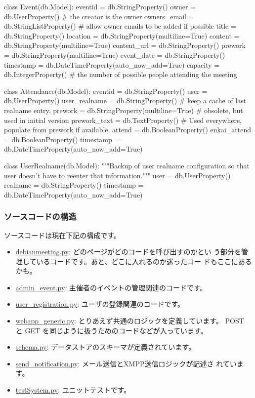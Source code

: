\documentclass[mingoth,a4paper]{jsarticle}
\begin{document}
\begin{commandline}

class Event(db.Model):
    eventid = db.StringProperty()
    owner = db.UserProperty() # the creator is the owner
    owners_email = db.StringListProperty() # allow owner emails to be added if possible
    title = db.StringProperty()
    location = db.StringProperty(multiline=True)
    content = db.StringProperty(multiline=True)
    content_url = db.StringProperty()
    prework = db.StringProperty(multiline=True)
    event_date = db.StringProperty()
    timestamp = db.DateTimeProperty(auto_now_add=True)
    capacity = db.IntegerProperty() # the number of possible people attending the meeting

class Attendance(db.Model):
    eventid = db.StringProperty()
    user = db.UserProperty()
    user_realname = db.StringProperty() # keep a cache of last realname entry.
    prework = db.StringProperty(multiline=True) # obsolete, but used in initial version
    prework_text = db.TextProperty() # Used everywhere, populate from prework if available.
    attend = db.BooleanProperty()
    enkai_attend = db.BooleanProperty()
    timestamp = db.DateTimeProperty(auto_now_add=True)

class UserRealname(db.Model):
    """Backup of user realname configuration so that user doesn't have to reenter that information."""
    user = db.UserProperty()
    realname = db.StringProperty()
    timestamp = db.DateTimeProperty(auto_now_add=True)

\end{commandline}

\subsubsection{ソースコードの構造}

ソースコードは現在下記の構成です。
\begin{itemize}
 \item \url{debianmeeting.py}: どのページがどのコードを呼び出すのかとい
       う部分を管理しているコードです。あと、どこに入れるのか迷ったコー
       ドもここにあるかも。
 \item \url{admin_event.py}: 主催者のイベントの管理関連のコードです。
 \item \url{user_registration.py}: ユーザの登録関連のコードです。
 \item \url{webapp_generic.py}: とりあえず共通のロジックを定義しています。
       POST と GET を同じように扱うためのコードなどが入っています。
 \item \url{schema.py}: データストアのスキーマが定義されています。
 \item \url{send_notification.py}: メール送信とXMPP送信ロジックが記述さ
       れています。
 \item \url{testSystem.py}: ユニットテストです。
\end{itemize}
\end{document}
